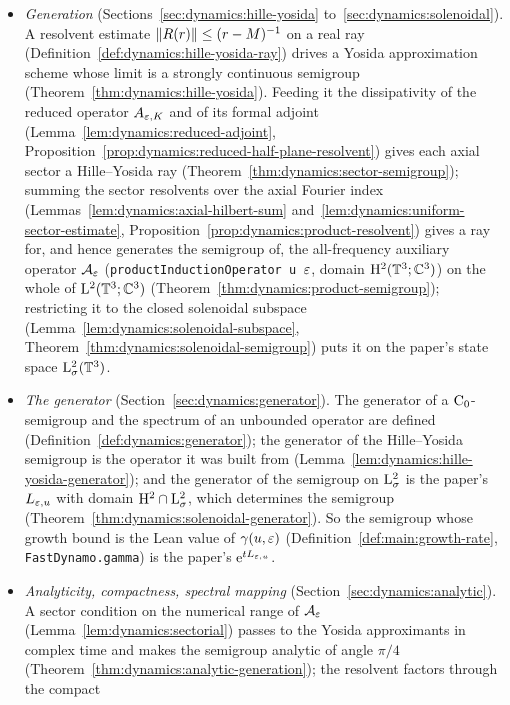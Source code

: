 \begin{itemize}
  \item \emph{Generation} (Sections~\ref{sec:dynamics:hille-yosida}
    to~\ref{sec:dynamics:solenoidal}).  A resolvent estimate $\left\|R(r)\right\|\leq(r-M)^{-1}$ on a
    real ray (Definition~\ref{def:dynamics:hille-yosida-ray}) drives a Yosida approximation
    scheme whose limit is a strongly continuous semigroup
    (Theorem~\ref{thm:dynamics:hille-yosida}).  Feeding it the dissipativity of the reduced
    operator $A_{\varepsilon,K}$ and of its formal adjoint
    (Lemma~\ref{lem:dynamics:reduced-adjoint},
    Proposition~\ref{prop:dynamics:reduced-half-plane-resolvent}) gives each axial sector a
    Hille--Yosida ray (Theorem~\ref{thm:dynamics:sector-semigroup}); summing the sector
    resolvents over the axial Fourier index (Lemmas~\ref{lem:dynamics:axial-hilbert-sum}
    and~\ref{lem:dynamics:uniform-sector-estimate},
    Proposition~\ref{prop:dynamics:product-resolvent}) gives a ray for, and hence generates
    the semigroup of, the all-frequency auxiliary operator $\mathcal A_\varepsilon$
    (\texttt{productInductionOperator u $\varepsilon$}, domain $\mathrm{H}^2(\mathbb{T}^3;\mathbb{C}^3)$) on the whole of
    $\mathrm{L}^2(\mathbb{T}^3;\mathbb{C}^3)$ (Theorem~\ref{thm:dynamics:product-semigroup}); restricting it to the
    closed solenoidal subspace (Lemma~\ref{lem:dynamics:solenoidal-subspace},
    Theorem~\ref{thm:dynamics:solenoidal-semigroup}) puts it on the paper's state space
    $\mathrm{L}^2_\sigma(\mathbb{T}^3)$.
  \item \emph{The generator} (Section~\ref{sec:dynamics:generator}).  The generator of a
    $\mathrm{C}_0$-semigroup and the spectrum of an unbounded operator are defined
    (Definition~\ref{def:dynamics:generator}); the generator of the Hille--Yosida semigroup is
    the operator it was built from (Lemma~\ref{lem:dynamics:hille-yosida-generator}); and the
    generator of the semigroup on $\mathrm{L}^2_\sigma$ is the paper's $L_{\varepsilon,u}$ with domain
    $\mathrm{H}^2\cap\mathrm{L}^2_\sigma$, which determines the semigroup
    (Theorem~\ref{thm:dynamics:solenoidal-generator}).  So the semigroup whose growth bound is
    the Lean value of $\gamma(u,\varepsilon)$ (Definition~\ref{def:main:growth-rate},
    \texttt{FastDynamo.gamma}) is the paper's $\mathrm{e}^{tL_{\varepsilon,u}}$.
  \item \emph{Analyticity, compactness, spectral mapping} (Section~\ref{sec:dynamics:analytic}).
    A sector condition on the numerical range of $\mathcal A_\varepsilon$
    (Lemma~\ref{lem:dynamics:sectorial}) passes to the Yosida approximants in complex time and
    makes the semigroup analytic of angle $\pi/4$
    (Theorem~\ref{thm:dynamics:analytic-generation}); the resolvent factors through the compact

\end{itemize}
